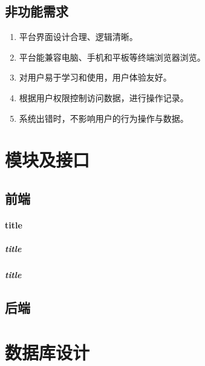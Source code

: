 \documentclass{article}
\begin{document}
    \subsection{非功能需求}
		\begin{enumerate}
			\item 平台界面设计合理、逻辑清晰。
			\item 平台能兼容电脑、手机和平板等终端浏览器浏览。
			\item 对用户易于学习和使用，用户体验友好。
			\item 根据用户权限控制访问数据，进行操作记录。
			\item 系统出错时，不影响用户的行为操作与数据。
		\end{enumerate}
		
\section{模块及接口}
    \subsection{前端}
    	\paragraph{title}
    		\subparagraph{title}
    		\subparagraph{title}
    \subsection{后端}
    
\section{数据库设计}
\end{document}
